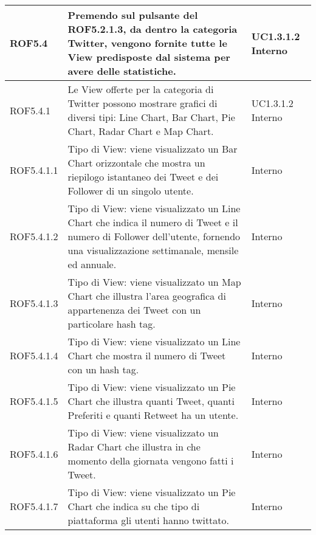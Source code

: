 \begin{center}
\begin{longtable}{| p{2.5cm} | p{8cm} | p{2cm} |}
		ROF5.4  &  Premendo sul pulsante del ROF5.2.1.3, da dentro la categoria Twitter, vengono fornite tutte le View predisposte dal sistema per avere delle statistiche. &  UC1.3.1.2 \newline Interno \\
		\hline
		ROF5.4.1  & Le View offerte per la categoria di Twitter possono mostrare grafici di diversi tipi: Line Chart, Bar Chart, Pie Chart, Radar Chart e Map Chart.  &  UC1.3.1.2 \newline Interno \\
		\hline
		ROF5.4.1.1  &  Tipo di View: viene visualizzato un Bar Chart orizzontale che mostra un riepilogo istantaneo dei Tweet e dei Follower di un singolo utente. & Interno \\
		\hline	
		ROF5.4.1.2  &  Tipo di View: viene visualizzato un Line Chart che indica il numero di Tweet e il numero di Follower dell'utente, fornendo una visualizzazione settimanale, mensile ed annuale. & Interno \\
		\hline
		ROF5.4.1.3  &  Tipo di View: viene visualizzato un Map Chart che illustra l'area geografica di appartenenza dei Tweet con un particolare hash tag. & Interno \\
		\hline
		ROF5.4.1.4  &  Tipo di View: viene visualizzato un Line Chart che mostra il numero di Tweet con un hash tag.  & Interno \\
		\hline
		ROF5.4.1.5  &  Tipo di View: viene visualizzato un Pie Chart che illustra quanti Tweet, quanti Preferiti e quanti Retweet ha un utente. & Interno \\
		\hline
		ROF5.4.1.6  &  Tipo di View: viene visualizzato un Radar Chart che illustra in che momento della giornata vengono fatti i Tweet. & Interno \\
		\hline
		ROF5.4.1.7  &  Tipo di View: viene visualizzato un Pie Chart che indica su che tipo di piattaforma gli utenti hanno twittato. & Interno \\
		\hline



\end{longtable}
\end{center}
